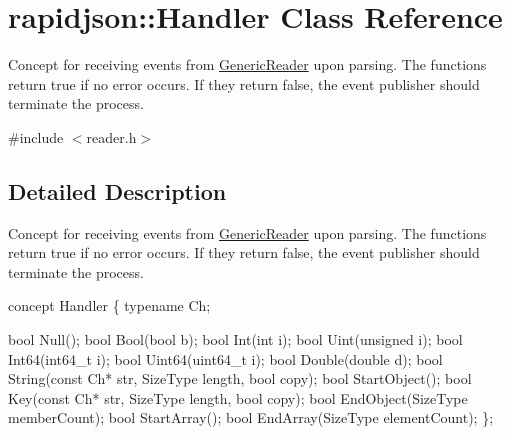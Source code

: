 \hypertarget{classrapidjson_1_1Handler}{}\section{rapidjson\+:\+:Handler Class Reference}
\label{classrapidjson_1_1Handler}


Concept for receiving events from \hyperlink{classGenericReader}{Generic\+Reader} upon parsing. The functions return true if no error occurs. If they return false, the event publisher should terminate the process.  




{\ttfamily \#include $<$reader.\+h$>$}



\subsection{Detailed Description}
Concept for receiving events from \hyperlink{classGenericReader}{Generic\+Reader} upon parsing. The functions return true if no error occurs. If they return false, the event publisher should terminate the process. 


\begin{DoxyCode}
concept Handler \{
    \textcolor{keyword}{typename} Ch;

    \textcolor{keywordtype}{bool} Null();
    \textcolor{keywordtype}{bool} Bool(\textcolor{keywordtype}{bool} b);
    \textcolor{keywordtype}{bool} Int(\textcolor{keywordtype}{int} i);
    \textcolor{keywordtype}{bool} Uint(\textcolor{keywordtype}{unsigned} i);
    \textcolor{keywordtype}{bool} Int64(int64\_t i);
    \textcolor{keywordtype}{bool} Uint64(uint64\_t i);
    \textcolor{keywordtype}{bool} Double(\textcolor{keywordtype}{double} d);
    \textcolor{keywordtype}{bool} String(\textcolor{keyword}{const} Ch* str, SizeType length, \textcolor{keywordtype}{bool} copy);
    \textcolor{keywordtype}{bool} StartObject();
    \textcolor{keywordtype}{bool} Key(\textcolor{keyword}{const} Ch* str, SizeType length, \textcolor{keywordtype}{bool} copy);
    \textcolor{keywordtype}{bool} EndObject(SizeType memberCount);
    \textcolor{keywordtype}{bool} StartArray();
    \textcolor{keywordtype}{bool} EndArray(SizeType elementCount);
\};
\end{DoxyCode}



